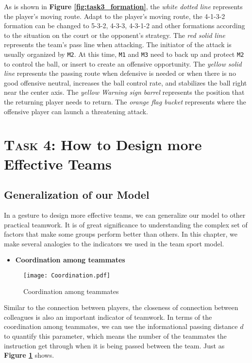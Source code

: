 \documentclass[12pt]{article}  %
\begin{document}
As is shown in \textbf{Figure \ref{fig:task3_formation}}, the \textit{white dotted line} represents the player's moving route. Adapt to the player's moving route, the \textsf{4-1-3-2} formation can be changed to \textsf{5-3-2}, \textsf{4-3-3}, \textsf{4-3-1-2} and other formations according to the situation on the court or the opponent's strategy. The \textit{red solid line} represents the team's pass line when attacking. The initiator of the attack is usually organized by \texttt{M2}. At this time, \texttt{M1} and \texttt{M3} need to back up and protect \texttt{M2} to control the ball, or insert to create an offensive opportunity. The \textit{yellow solid line} represents the passing route when defensive is needed or when there is no good offensive neutral, increases the ball control rate, and stabilizes the ball right near the center axis. The \textit{yellow Warning sign barrel} represents the position that the returning player needs to return. The \textit{orange flag bucket} represents where the offensive player can launch a threatening attack.

\section{\textsc{Task 4}: How to Design more Effective Teams}
\subsection{Generalization of our Model}\label{sec7.1}
In a gesture to design more effective teams, we can generalize our model to other practical teamwork. It is of great significance to understanding the complex set of factors that make some groups perform better than others. In this chapter, we make several analogies to the indicators we used in the team sport model. 
\vspace{4pt}
\begin{itemize}
    \item \textbf{Coordination among teammates}
\end{itemize}

\begin{figure}[htbp]
    \centering
    \texttt{[image: Coordination.pdf]} 	%
    \caption{Coordination among teammates}		%
    \label{fig:Coordination}							%
\end{figure}

Similar to the connection between players, the closeness of connection between colleagues is also an important indicator of teamwork. In terms of the coordination among teammates, we can use the informational passing distance $d$ to quantify this parameter, which means the number of the teammates the instruction get through when it is being passed between the team. Just as \textbf{Figure \ref{fig:Coordination}} shows.
\end{document}
